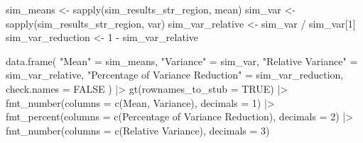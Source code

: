 \documentclass[
  letterpaper,
  DIV=11,
  numbers=noendperiod]{scrreprt}
\newenvironment{Shaded}{\begin{snugshade}}{\end{snugshade}}
\newcommand{\AttributeTok}[1]{\textcolor[rgb]{0.40,0.45,0.13}{#1}}
\newcommand{\ConstantTok}[1]{\textcolor[rgb]{0.56,0.35,0.01}{#1}}
\newcommand{\DecValTok}[1]{\textcolor[rgb]{0.68,0.00,0.00}{#1}}
\newcommand{\FunctionTok}[1]{\textcolor[rgb]{0.28,0.35,0.67}{#1}}
\newcommand{\NormalTok}[1]{\textcolor[rgb]{0.00,0.23,0.31}{#1}}
\newcommand{\OtherTok}[1]{\textcolor[rgb]{0.00,0.23,0.31}{#1}}
\newcommand{\SpecialCharTok}[1]{\textcolor[rgb]{0.37,0.37,0.37}{#1}}
\newcommand{\StringTok}[1]{\textcolor[rgb]{0.13,0.47,0.30}{#1}}
\renewcommand{\[}{\begin{equation}}
\renewcommand{\]}{\end{equation}}
\begin{document}
\begin{Shaded}
\begin{Highlighting}[]
\NormalTok{sim\_means }\OtherTok{\textless{}{-}} \FunctionTok{sapply}\NormalTok{(sim\_results\_str\_region, mean)}
\NormalTok{sim\_var }\OtherTok{\textless{}{-}} \FunctionTok{sapply}\NormalTok{(sim\_results\_str\_region, var)}
\NormalTok{sim\_var\_relative }\OtherTok{\textless{}{-}}\NormalTok{ sim\_var }\SpecialCharTok{/}\NormalTok{ sim\_var[}\DecValTok{1}\NormalTok{]}
\NormalTok{sim\_var\_reduction }\OtherTok{\textless{}{-}} \DecValTok{1} \SpecialCharTok{{-}}\NormalTok{ sim\_var\_relative}

\FunctionTok{data.frame}\NormalTok{(}
  \StringTok{"Mean"} \OtherTok{=}\NormalTok{ sim\_means,}
  \StringTok{"Variance"} \OtherTok{=}\NormalTok{ sim\_var,}
  \StringTok{"Relative Variance"} \OtherTok{=}\NormalTok{ sim\_var\_relative,}
  \StringTok{"Percentage of Variance Reduction"} \OtherTok{=}\NormalTok{ sim\_var\_reduction,}
  \AttributeTok{check.names =} \ConstantTok{FALSE}
\NormalTok{) }\SpecialCharTok{|\textgreater{}}
  \FunctionTok{gt}\NormalTok{(}\AttributeTok{rownames\_to\_stub =} \ConstantTok{TRUE}\NormalTok{) }\SpecialCharTok{|\textgreater{}}
  \FunctionTok{fmt\_number}\NormalTok{(}\AttributeTok{columns =} \FunctionTok{c}\NormalTok{(Mean, Variance), }\AttributeTok{decimals =} \DecValTok{1}\NormalTok{) }\SpecialCharTok{|\textgreater{}}
  \FunctionTok{fmt\_percent}\NormalTok{(}\AttributeTok{columns =} \FunctionTok{c}\NormalTok{(}\StringTok{\textasciigrave{}}\AttributeTok{Percentage of Variance Reduction}\StringTok{\textasciigrave{}}\NormalTok{), }\AttributeTok{decimals =} \DecValTok{2}\NormalTok{) }\SpecialCharTok{|\textgreater{}}
  \FunctionTok{fmt\_number}\NormalTok{(}\AttributeTok{columns =} \FunctionTok{c}\NormalTok{(}\StringTok{\textasciigrave{}}\AttributeTok{Relative Variance}\StringTok{\textasciigrave{}}\NormalTok{), }\AttributeTok{decimals =} \DecValTok{3}\NormalTok{)}
\end{Highlighting}
\end{Shaded}

\begin{table}

\caption{\label{tbl-agpop-region-compare-methods}Simulated mean,
variance, and variance reduction by allocation method (region strata)}


\end{table}%
\end{document}
